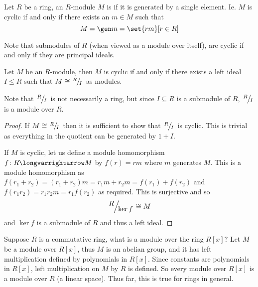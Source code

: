 \documentclass[10pt]{article}
\let\longto=\longvarrightarrow
\begin{document}


\bigskip

\begin{defn*}

    Let $R$ be a ring, an $R$-module $M$ is  if it is generated by a single element.
    Ie. $M$ is cyclic if and only if there exists an $m\in M$ such that
    \[ M = \gen m = \set{rm}[r\in R] \]

\end{defn*}

Note that submodules of $R$ (when viewed as a module over itself), are cyclic if and only if they are principal ideals.

\begin{prop*}

    Let $M$ be an $R$-module, then $M$ is cyclic if and only if there exists a left ideal $I\leq R$ such that $M\cong\slfrac RI$ as modules.

\end{prop*}

Note that $\slfrac RI$ is not necessarily a ring, but since $I\subseteq R$ is a submodule of $R$, $\slfrac RI$ is a module over $R$.

\begin{proof}

    If $M\cong\slfrac RI$ then it is sufficient to show that $\slfrac RI$ is cyclic.
    This is trivial as everything in the quotient can be generated by $1+I$.

    If $M$ is cyclic, let us define a module homomorphism $f\colon R\longto M$ by $f(r)=rm$ where $m$ generates $M$.
    This is a module homomorphism as $f(r_1+r_2)=(r_1+r_2)m=r_1m+r_2m=f(r_1)+f(r_2)$ and $f(r_1r_2)=r_1r_2m=r_1f(r_2)$ as required.
    This is surjective and so
    \[ \slfrac R{\ker f}\cong M \]
    and $\ker f$ is a submodule of $R$ and thus a left ideal.

\end{proof}

Suppose $R$ is a commutative ring, what is a module over the ring $R[x]$?
Let $M$ be a module over $R[x]$, thus $M$ is an abelian group, and it has left multiplication defined by polynomials in $R[x]$.
Since constants are polynomials in $R[x]$, left multiplication on $M$ by $R$ is defined.
So every module over $R[x]$ is a module over $R$ (a linear space).
Thus far, this is true for rings in general.
\end{document}
